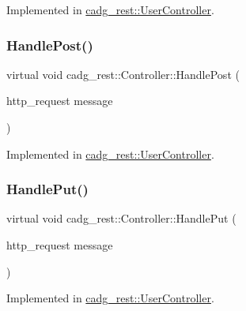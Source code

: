 Implemented in \mbox{\hyperlink{classcadg__rest_1_1_user_controller_ae31aee8fecf0d1f7d0ba70c0e62da54d}{cadg\+\_\+rest\+::\+User\+Controller}}.

\mbox{\label{classcadg__rest_1_1_controller_ae30a2dd46e5054409b98df686327a9c4}} 
\subsubsection{\texorpdfstring{HandlePost()}{HandlePost()}}
{\footnotesize\ttfamily virtual void cadg\+\_\+rest\+::\+Controller\+::\+Handle\+Post (\begin{DoxyParamCaption}\item[{http\+\_\+request}]{message }\end{DoxyParamCaption})\hspace{0.3cm}{\ttfamily [pure virtual]}}



Implemented in \mbox{\hyperlink{classcadg__rest_1_1_user_controller_a6c3307f7b6fd4dc0b697bc956503e478}{cadg\+\_\+rest\+::\+User\+Controller}}.

\mbox{\label{classcadg__rest_1_1_controller_a8edfa04d68e8b78759940cd29ff09781}} 
\subsubsection{\texorpdfstring{HandlePut()}{HandlePut()}}
{\footnotesize\ttfamily virtual void cadg\+\_\+rest\+::\+Controller\+::\+Handle\+Put (\begin{DoxyParamCaption}\item[{http\+\_\+request}]{message }\end{DoxyParamCaption})\hspace{0.3cm}{\ttfamily [pure virtual]}}



Implemented in \mbox{\hyperlink{classcadg__rest_1_1_user_controller_a5da4d0addb0504184929a57d7f196c79}{cadg\+\_\+rest\+::\+User\+Controller}}.

\mbox{\label{classcadg__rest_1_1_controller_a47b2c049207e02f407a55a64e2a2ce80}} 

